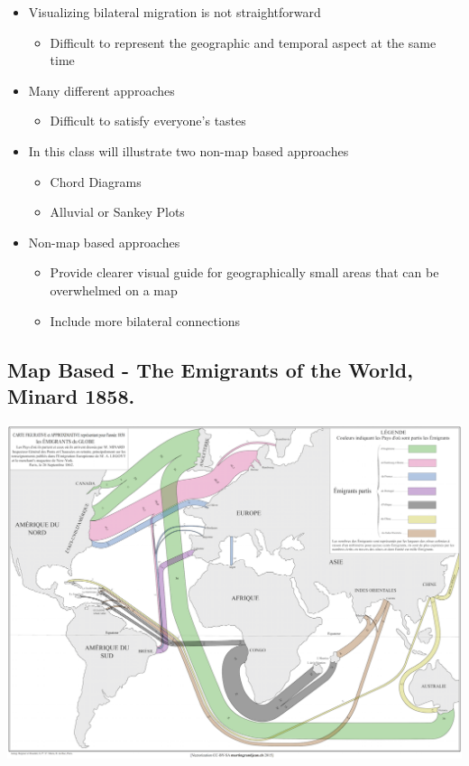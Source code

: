 \documentclass[
]{book}
\providecommand{\tightlist}{%
  \setlength{\itemsep}{0pt}\setlength{\parskip}{0pt}}
\begin{document}
\begin{itemize}
\tightlist
\item
  Visualizing bilateral migration is not straightforward

  \begin{itemize}
  \tightlist
  \item
    Difficult to represent the geographic and temporal aspect at the same time
  \end{itemize}
\item
  Many different approaches

  \begin{itemize}
  \tightlist
  \item
    Difficult to satisfy everyone's tastes
  \end{itemize}
\item
  In this class will illustrate two non-map based approaches

  \begin{itemize}
  \tightlist
  \item
    Chord Diagrams
  \item
    Alluvial or Sankey Plots
  \end{itemize}
\item
  Non-map based approaches

  \begin{itemize}
  \tightlist
  \item
    Provide clearer visual guide for geographically small areas that can be overwhelmed on a map
  \item
    Include more bilateral connections
  \end{itemize}
\end{itemize}

\hypertarget{map-based---the-emigrants-of-the-world-minard-1858.}{%
\subsection{Map Based - The Emigrants of the World, Minard 1858.}\label{map-based---the-emigrants-of-the-world-minard-1858.}}

\includegraphics[width=1\linewidth]{img/minard}
\end{document}

